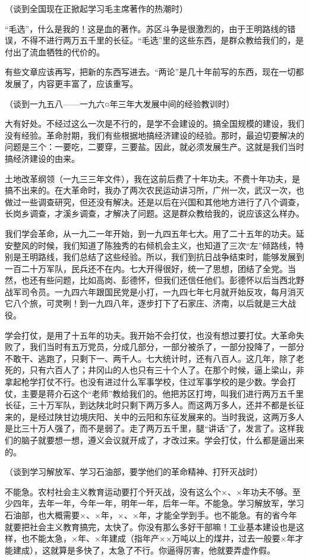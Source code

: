 （谈到全国现在正掀起学习毛主席著作的热潮时）

“毛选”，什么是我的！这是血的著作。苏区斗争是很激烈的，由于王明路线的错误，不得不进行两万五千里的长征。“毛选”里的这些东西，是群众教给我们的，是付出了流血牺牲的代价的。

有些文章应该再写，把新的东西写进去。“两论”是几十年前写的东西，现在一切都发展了，内容更丰富了，应该重写。

（谈到一九五八——一九六○年三年大发展中间的经验教训时）

大有好处。不经过这么一次是不行的，是学不会建设的。搞全国规模的建设，我们没有经验。革命肘期，我们有些根据地搞经济建设的经验。那时，最迫切要解决的问题是三个：一要吃，二要穿，三要盐。因此，就必须发展生产。这就是我们当时搞经济建设的由来。

土地改革纲领（一九三三年文件），我在这前后费了十年功夫。不费十年功夫，是搞不出来的。在大革命时，我办了两次农民运动讲习所，广州一次，武汉一次，也做过一些调查研究，但还没有解决。还是以后在兴国和其他地方进行了八个调查，长岗乡调查，才溪乡调查，才解决了问题。这是群众教给我的，说应该这么样办。

我们学会革命，从一九二一年开始，到一九四五年七大。用了二十五年的功夫。延安整风的时候，我们知道了陈独秀的右倾机会主义，也知道了三次“左”倾路线，特别是王明路线，我们总结了这些经验。所以，我们到抗日战争结束时，能够发展到一百二十万军队，民兵还不在内。七大开得很好，统一了思想，团结了全党。当然，也还有些问题，比如高岗、彭德怀，但我们还信任他们。彭德怀以后当西北野战军司令员。一九四六年跟国民党是小打，一九四七年七月就开始反攻，每月消灭它八个旅，可灵咧！到一九四八年，逐步打下了石家庄、济南，以后就是三大战役。

学会打仗，是用了十五年的功夫。我开始不会打仗，也没有想过要打仗。大革命失败了，我们当时有五万党员，分成几部分，一部分被杀了，一部分投降了，一部分不敢干、逃跑了，只剩下一、两千人。七大统计时，还有八百人。这几年，除了老死的，只有六百人了；井冈山的人也只有三十个人了。在那个时候，逼上梁山，非拿起枪学打仗不行。也没有进过什么军事学校，住过军事学校的是少数。学会打仗，主要是蒋介石这个“老师”教给我们的。他把苏区打垮，叫我们进行两万五千里长征，三十万军队，到达陕北时只剩下两万多人。而这两万多人，还并不都是长征来的，是经过陕甘边境庆阳、关中的云阳和东征发展来的。当时我说，这两万多人是比三十万人强了，而不是弱了。走了两万五千里，腿“讲话”了，发言了。这样我们的脑子就要想一想，遵义会议就开成了，才改过来。学会打仗，什么都是逼出来的。

（谈到学习解放军、学习石油部，要学他们的革命精神、打歼灭战时）

不能急。农村社会主义教育运动要打个歼灭战，没有这么个×、×年功夫不够。至少四年，去年一年，今年一年，明年一年，后年一年。不能急。学习解放军，学习石油部，也大概需要×、×年，×、×年，才能全学到手。也不能急。有的省今年就要把社会主义教育搞完，太快了。你没有那么多好干部嘛！工业基本建设也是这样，也不能太急，×年、×年建成（指年产××万吨以上的煤井，过去一般要×年才能建成），这就算是多快了，太急了不行。你逼得厉害，他就要弄虚作假。

